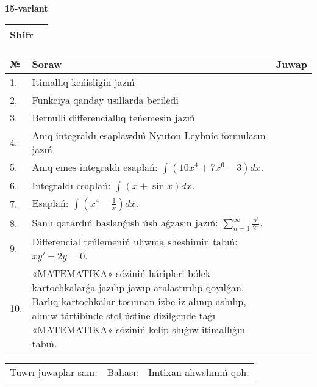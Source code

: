\documentclass{article}
\begin{document}
  \egroup
  
  \newpage
  
  
  \textbf{15-variant}\\
  
  \bgroup
  \def\arraystretch{1.6} %
  
  \begin{tabular}{|m{5.7cm}|m{9.5cm}|}
  \hline
  Shifr & \\
  \hline
  \end{tabular}
  
  \vspace{1cm}
  
  \begin{tabular}{|m{0.7cm}|m{10cm}|m{4cm}|}
  \hline
  № & Soraw & Juwap \\
  \hline
  1. & Itimallıq keńisligin jazıń &  \\
  \hline
  2. & Funkciya qanday usıllarda beriledi &  \\
  \hline
  3. & Bernulli differenciallıq teńemesin jazıń &  \\
  \hline
  4. & Anıq integraldı esaplawdıń Nyuton-Leybnic formulasın jazıń &  \\
  \hline
  5. & Anıq emes integraldı esaplań: \(\int{\left( 10x^{4} + 7x^{6} - 3 \right)dx}\). &  \\
  \hline
  6. & Integraldı esaplań: \(\int{(x + \sin x)dx}\). &  \\
  \hline
  7. & Esaplań: \(\int\left( x^{4} - \frac{1}{x} \right)dx\). &  \\
  \hline
  8. & Sanlı qatardıń baslanǵısh úsh aǵzasın jazıń: \(\sum_{n = 1}^{\infty}\frac{n!}{2^{n}}\). &  \\
  \hline
  9. & Differencial teńlemeniń ulıwma sheshimin tabıń: \(xy' - 2y = 0\). &  \\
  \hline
  10. & «MATEMATIKA» sóziniń háripleri bólek kartochkalarǵa jazılıp jawıp aralastırılıp qoyılǵan. Barlıq kartochkalar tosınnan izbe-iz alınıp ashılıp, alınıw tártibinde stol ústine dizilgende taǵı «MATEMATIKA» sóziniń kelip shıǵıw itimallıǵın tabıń. &  \\
  \hline
  \end{tabular}
  
  \vspace{1cm}
  
  \begin{tabular}{lll}
  Tuwrı juwaplar sanı: \underline{\hspace{1.5cm}} & 
  Bahası: \underline{\hspace{1.5cm}} & 
  Imtixan alıwshınıń qolı: \underline{\hspace{2cm}} \\
  \end{tabular}
  
\end{document}
